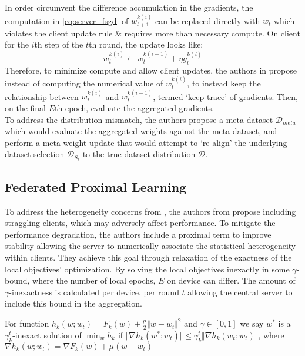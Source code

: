 In order circumvent the difference accumulation in the gradients, the computation in \autoref{eq:server_fsgd} of $w^{k(i)}_{t+1}$ can be replaced directly with $w_t$ which violates the client update rule \& requires more than necessary compute. On client for the $i$th step of the $t$th round, the update looks like: 
\begin{equation}
    w^{k(i)}_{t} \leftarrow  w^{k(i-1)}_{t} + \eta g_t^{k(i)}
\end{equation}
Therefore, to minimize compute and allow client updates, the authors in \cite{yao2019federated} propose instead of computing the numerical value of $ w^{k(i)}_{t}$, to instead keep the relationship between $ w^{k(i)}_{t}$ and $ w^{k(i-1)}_{t}$, termed `keep-trace' of gradients. Then, on the final $E$th epoch, evaluate the aggregated gradients. \\

To address the distribution mismatch, the authors propose a meta dataset $\mathcal{D}_{meta}$ which would evaluate the aggregated weights against the meta-dataset, and perform a meta-weight update that would attempt to `re-align' the underlying dataset selection $\mathcal{D}_{S_t}$ to the true dataset distribution $\mathcal{D}$.

\subsection{Federated Proximal Learning}
To address the heterogeneity concerns from \cite{konevcny2016federated}, the authors from \cite{li2020federated} propose including straggling clients, which may adversely affect performance. To mitigate the performance degradation, the authors include a proximal term to improve stability allowing the server to numerically associate the statistical heterogeneity within clients. They achieve this goal through relaxation of the exactness of the local objectives' optimization. By solving the local objectives inexactly in some $\gamma$-bound, where the number of local epochs, $E$ on device can differ. The amount of $\gamma$-inexactness is calculated per device, per round $t$ allowing the central server to include this bound in the aggregation. \\

\begin{definition}\label{def:gminexact}
For function $h_k(w;w_t)  = F_k(w) + \frac{\mu}{2}\Vert w - w_t\Vert^2$ and $\gamma \in [0, 1]$ we say $w^*$ is a $\gamma_k^t$-inexact solution of $\min_{w} h_k$ if $\Vert \nabla h_k(w^*; w_t) \Vert \leq \gamma_k^t \Vert \nabla h_k(w_t; w_t) \Vert$, where $ \nabla h_k(w; w_t) = \nabla F_k(w) + \mu(w-w_t)$
\end{definition}

